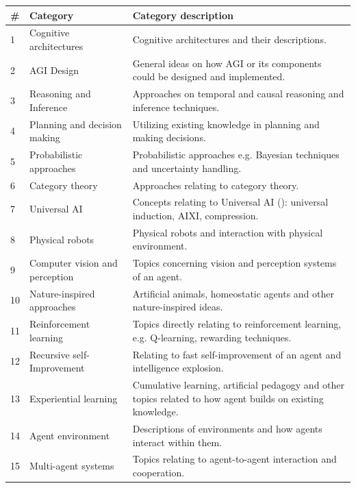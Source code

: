 \documentclass[utf8,english]{gradu3}
\begin{document}
\begin{table}[H]
  \footnotesize
  \centering
  \begin{tabular}{p{0.05\linewidth} p{0.30\linewidth} p{0.65\linewidth}}

    \textbf{\#} & \textbf{Category}  & \textbf{Category description}  \\ \hline
    1  & Cognitive architectures & Cognitive architectures and their descriptions.  \\ \hline
    2  & AGI Design & General ideas on how AGI or its components could be designed and implemented. \\ \hline
    3	 & Reasoning and Inference &  Approaches on temporal and causal reasoning and inference techniques. \\ \hline
    4	 & Planning and decision making & Utilizing existing knowledge in planning and making decisions. \\ \hline
    5	 & Probabilistic approaches & Probabilistic approaches e.g. Bayesian techniques and uncertainty handling.\\ \hline
    6	 & Category theory & Approaches relating to category theory.\\ \hline
    7	 & Universal AI & Concepts relating to Universal AI (\cite{hutter2004}): universal induction, AIXI, compression.\\ \hline
    8	 & Physical robots & Physical robots and interaction with physical environment. \\ \hline
    9	 & Computer vision and perception & Topics concerning vision and perception systems of an agent.\\ \hline
    10 & Nature-inspired approaches & Artificial animals, homeostatic agents and other nature-inspired ideas.\\ \hline
    11 & Reinforcement learning & Topics directly relating to reinforcement learning, e.g. Q-learning, rewarding techniques.\\ \hline
    12 & Recursive self-Improvement & Relating to fast self-improvement of an agent and intelligence explosion. \\ \hline
    13 & Experiential learning & Cumulative learning, artificial pedagogy and other topics related to how agent builds on existing knowledge.\\ \hline
    14 & Agent environment & Descriptions of environments and how agents interact within them.\\ \hline
    15 & Multi-agent systems & Topics relating to agent-to-agent interaction and cooperation.\\ \hline

\end{tabular}
\end{table}
\end{document}
